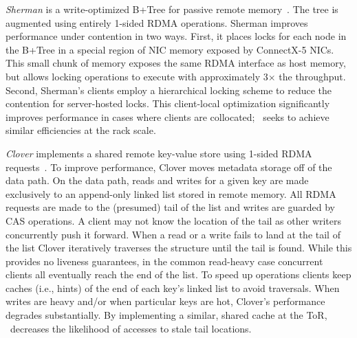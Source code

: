\emph{Sherman} is a write-optimized B+Tree for passive remote memory~\cite{sherman}. The
tree is augmented using entirely 1-sided RDMA operations. Sherman
improves performance under contention in two ways. First, it
places locks for each node in the B+Tree in a special region of NIC
memory exposed by ConnectX-5 NICs.  This small chunk of memory exposes
the same RDMA interface as host memory, but allows locking operations
to execute with approximately 3$\times$ the throughput.  Second,
Sherman's clients employ a hierarchical locking scheme to reduce the
contention for server-hosted locks.  This client-local optimization
significantly improves performance in cases where clients are
collocated; \sword\ seeks to achieve similar efficiencies at the rack
scale.






\emph{Clover} implements a shared remote key-value store using
1-sided RDMA requests~\cite{clover}.
To improve
performance, Clover moves metadata storage off of the data path. On
the data path, reads and writes for a given key are made exclusively
to an append-only linked list stored in remote memory. All RDMA
requests are made to the (presumed) tail of the list and writes are
guarded by CAS operations. A client may not know the location of the
tail as other writers concurrently push it forward. When a read or a
write fails to land at the tail of the list Clover iteratively
traverses the structure until the tail is found. While this provides
no liveness guarantees, in the common read-heavy case concurrent
clients all eventually reach the end of the list. To speed up
operations clients keep caches (i.e., hints) of the end of each key's
linked list to avoid traversals. When writes are heavy and/or when
particular keys are hot, Clover's performance degrades substantially.
By implementing a similar, shared cache at the ToR, \sword\ 
decreases the likelihood of accesses to stale tail locations.


